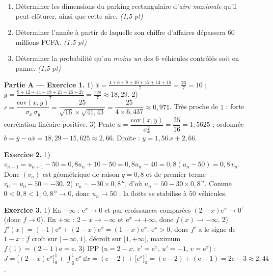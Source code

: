 \begin{enumerate}[label=\textbf{Tâche \arabic*.},leftmargin=2.4em]
\item Déterminer les dimensions du parking rectangulaire d'\emph{aire maximale} qu'il peut
clôturer, ainsi que cette aire. \hfill\textit{(1,5 pt)}
\item Déterminer l'année à partir de laquelle son chiffre d'affaires dépassera $60$ millions FCFA. \hfill\textit{(1,5 pt)}
\item Déterminer la probabilité qu'\emph{au moins un} des $6$ véhicules contrôlés soit en panne. \hfill\textit{(1,5 pt)}
\end{enumerate}
\par{}


\noindent\textbf{Partie A — Exercice 1.}
1) $\bar x=\frac{4+6+8+10+12+14+16}{7}=\frac{70}{7}=10$ ;
$\bar y=\frac{9+12+14+19+21+26+27}{7}=\frac{128}{7}\approx18{,}29$.
2) $r=\dfrac{\mathrm{cov}(x,y)}{\sigma_x\,\sigma_y}=\dfrac{25}{\sqrt{16}\times\sqrt{41{,}43}}
=\dfrac{25}{4\times6{,}437}\approx0{,}971$. Très proche de $1$ : forte corrélation linéaire positive.
3) Pente $a=\dfrac{\mathrm{cov}(x,y)}{\sigma_x^2}=\dfrac{25}{16}=1{,}5625$ ;
ordonnée $b=\bar y-a\bar x=18{,}29-15{,}625\approx2{,}66$.
Droite : $y=1{,}56\,x+2{,}66$.

\noindent\textbf{Exercice 2.}
1) $v_{n+1}=u_{n+1}-50=0{,}8u_n+10-50=0{,}8u_n-40=0{,}8(u_n-50)=0{,}8\,v_n$.
Donc $(v_n)$ est géométrique de raison $q=0{,}8$ et de premier terme $v_0=u_0-50=-30$.
2) $v_n=-30\times0{,}8^{\,n}$, d'où $u_n=50-30\times0{,}8^{\,n}$.
Comme $0<0{,}8<1$, $0{,}8^{\,n}\to0$, donc $u_n\to50$ : la flotte se stabilise à $50$ véhicules.

\noindent\textbf{Exercice 3.}
1) En $-\infty$ : $\mathrm{e}^x\to0$ et par croissances comparées $(2-x)\mathrm{e}^x\to0^+$ (donc $f\to0$).
En $+\infty$ : $2-x\to-\infty$ et $\mathrm{e}^x\to+\infty$, donc $f(x)\to-\infty$.
2) $f'(x)=(-1)\mathrm{e}^x+(2-x)\mathrm{e}^x=(1-x)\mathrm{e}^x$. $\mathrm{e}^x>0$, donc $f'$ a le signe de $1-x$ :
$f$ croît sur $]-\infty,1]$, décroît sur $[1,+\infty[$, maximum $f(1)=(2-1)\mathrm e=\mathrm e$.
3) IPP ($u=2-x$, $v'=\mathrm{e}^x$, $u'=-1$, $v=\mathrm e^x$) :
$J=\big[(2-x)\mathrm{e}^x\big]_0^1+\int_0^1\mathrm{e}^x\,\dd x=(\mathrm e-2)+\big[\mathrm e^x\big]_0^1
=(\mathrm e-2)+(\mathrm e-1)=2\mathrm e-3\approx2{,}44$.

